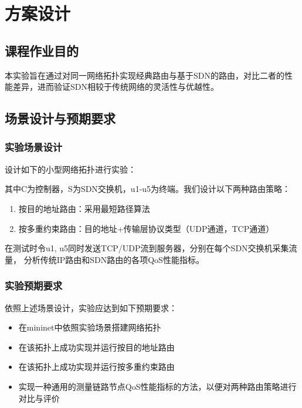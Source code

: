 \chapter{方案设计}
\label{cha:example}


\setmonofont [Path = fonts/] {CascadiaCode}
\newfontfamily{}
\newfontfamily{}

\lstset{
    basicstyle = \small\ttfamily,
    tabsize=4
}

\section{课程作业目的}

本实验旨在通过对同一网络拓扑实现经典路由与基于SDN的路由，对比二者的性能差异，进而验证SDN相较于传统网络的灵活性与优越性。

\section{场景设计与预期要求}

\subsection{实验场景设计}

设计如下的小型网络拓扑进行实验：



其中C为控制器，S为SDN交换机，u1-u5为终端。我们设计以下两种路由策略：

\begin{enumerate}
	\item 按目的地址路由：采用最短路径算法
	\item 按多重约束路由：目的地址+传输层协议类型（UDP通道，TCP通道）
\end{enumerate}

在测试时令u1, u5同时发送TCP/UDP流到服务器，分别在每个SDN交换机采集流量，
分析传统IP路由和SDN路由的各项QoS性能指标。

\subsection{实验预期要求}

依照上述场景设计，实验应达到如下预期要求：

\begin{itemize}
	\item 在mininet中依照实验场景搭建网络拓扑
	\item 在该拓扑上成功实现并运行按目的地址路由
	\item 在该拓扑上成功实现并运行按多重约束路由
	\item 实现一种通用的测量链路节点QoS性能指标的方法，以便对两种路由策略进行对比与评价
\end{itemize}


